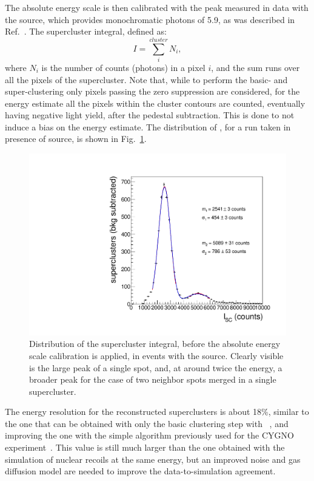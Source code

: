 The absolute energy scale is then calibrated with the peak measured in
data with the \fe source, which provides monochromatic photons of
5.9\keV, as was described in Ref.~\cite{bib:fe55}. The supercluster
integral, defined as:
\begin{equation}
\label{eq:integral}
I = \sum_i^{cluster} N_i,
\end{equation}
where $N_i$ is the number of counts (photons) in a pixel $i$, and the
sum runs over all the pixels of the supercluster. Note that, while to
perform the basic- and super-clustering only pixels passing the zero
suppression are considered, for the energy estimate all the pixels
within the cluster contours are counted, eventually having negative
light yield, after the pedestal subtraction. This is done to not
induce a bias on the energy estimate.  The distribution of \isclu, for
a run taken in presence of \fe source, is shown in
Fig.~\ref{fig:feuncalibpeak}.
%
\begin{figure}[ht]
  \begin{center}
    \includegraphics[width=0.49\linewidth]{figures/fe_ucalibintegral_fit}
    \caption{Distribution of the supercluster integral, before the
      absolute energy scale calibration is applied, in events with the
      \fe source. Clearly visible is the large peak of a single spot,
      and, at around twice the energy, a broader peak for the case of
      two neighbor spots merged in a single supercluster.
      \label{fig:feuncalibpeak}}
  \end{center}
\end{figure}
%
The energy resolution for the reconstructed \gac superclusters is
about 18\%, similar to the one that can be obtained with only the
basic clustering step with \idbscan~\cite{iDBSCAN}, and improving the
one with the simple \nnc algorithm previously used for the CYGNO
experiment~\cite{bib:fe55}. This value is still much larger than the
one obtained with the simulation of nuclear recoils at the same
energy, but an improved noise and gas diffusion model are needed to
improve the data-to-simulation agreement.

